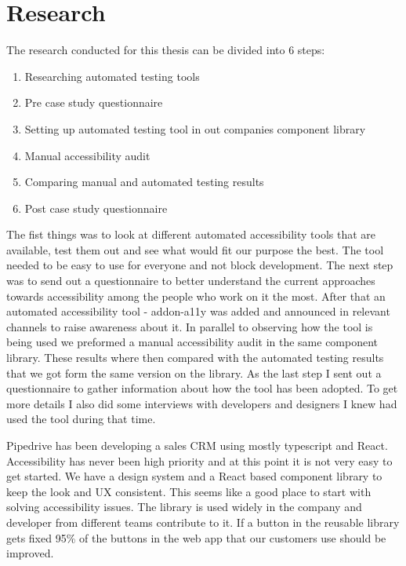 \documentclass{master_thesis}
\begin{document}
\section{Research}


The research conducted for this thesis can be divided into 6 steps:

\begin{enumerate}
	\item Researching automated testing tools
	\item Pre case study questionnaire
	\item Setting up automated testing tool in out companies component library
	\item Manual accessibility audit
	\item Comparing manual and automated testing results
	\item Post case study questionnaire
\end{enumerate}

The fist things was to look at different automated accessibility tools that are available, test them out and see what would fit our purpose the best. The tool needed to be easy to use for everyone and not block development. The next step was to send out a questionnaire to better understand the current approaches towards accessibility among the people who work on it the most. After that an automated accessibility tool - addon-a11y \citep{addon-a11y} was added and announced in relevant channels to raise awareness about it. In parallel to observing how the tool is being used we preformed a manual accessibility audit in the same component library. These results where then compared with the automated testing results that we got form the same version on the library. As the last step I sent out a questionnaire to gather information about how the tool has been adopted. To get more details I also did some interviews with developers and designers I knew had used the tool during that time.

Pipedrive has been developing a sales CRM using mostly typescript and React. Accessibility has never been high priority and at this point it is not very easy to get started. We have a design system and a React based component library to keep the look and UX consistent. This seems like a good place to start with solving accessibility issues. The library is used widely in the company and developer from different teams contribute to it. If a button in the reusable library gets fixed 95\% of the buttons in the web app that our customers use should be improved.
\end{document}

